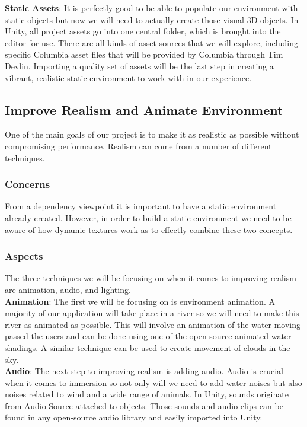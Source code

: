 \documentclass[10pt,journal,compsoc,onecolumn, draftclsnofoot]{IEEEtran}
\begin{document}
\hangindent=0.5cm \textbf{Static Assets}: It is perfectly good to be able to populate our environment with static objects but now we will need to actually create those visual 3D objects. In Unity, all project assets go into one central folder, which is brought into the editor for use. \cite{unity_importing_assets} There are all kinds of asset sources that we will explore, including specific Columbia asset files that will be provided by Columbia through Tim Devlin. Importing a quality set of assets will be the last step in creating a vibrant, realistic static environment to work with in our experience.\\

\subsection{Improve Realism and Animate Environment}
One of the main goals of our project is to make it as realistic as possible
without compromising performance. Realism can come from a number of different
techniques.
\subsubsection{Concerns}
From a dependency viewpoint it is important to have a static environment already created. However, in order to build a static environment we need to be aware of how dynamic textures work as to effectly combine these two concepts.

\subsubsection{Aspects}
The three techniques we will be focusing on when it comes to improving realism are animation, audio, and lighting. \\

\hangindent=0.5cm \textbf{Animation}: The first we will be focusing on is environment animation. A majority of our application will take place in a river so we will need to make this river as animated as possible. This will involve an animation of the water moving passed the users and can be done using one of the open-source animated water shadings. A similar technique can be used to create movement of clouds in the sky.\\

\hangindent=0.5cm \textbf{Audio}: The next step to improving realism is adding audio. Audio is crucial when it comes to immersion so not only will we need to add water noises but also noises related to wind and a wide range of animals. In Unity, sounds originate from Audio Source attached to objects. Those sounds and audio clips can be found in any open-source audio library and easily imported into Unity. \\
\end{document}
